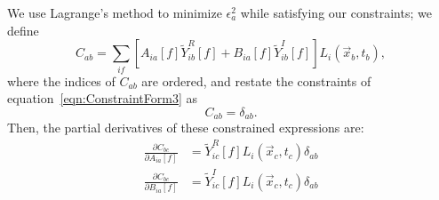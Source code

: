 We use Lagrange's method to minimize $\epsilon^2_a$ while satisfying our constraints; we define
\begin{equation}
C_{ab} = \sum_{if}\left[A_{ia}[f] \widetilde{Y}_{ib}^R[f] + B_{ia}[f] \widetilde{Y}_{ib}^I[f]\right] L_i(\vec{x}_b,t_b),
\end{equation}
where the indices of $C_{ab}$ are ordered, and restate the constraints of equation~\ref{eqn:ConstraintForm3} as
\begin{equation}
C_{ab} = \delta_{ab}.
\end{equation}
Then, the partial derivatives of these constrained expressions are:
\begin{subequations}\begin{align}
\frac{\partial C_{bc}}{\partial A_{ia}[f]} &= \widetilde{Y}^R_{ic}[f] L_i(\vec{x}_c,t_c) \delta_{ab} \\
\frac{\partial C_{bc}}{\partial B_{ia}[f]} &= \widetilde{Y}^I_{ic}[f] L_i(\vec{x}_c,t_c) \delta_{ab}
\end{align}\end{subequations}

